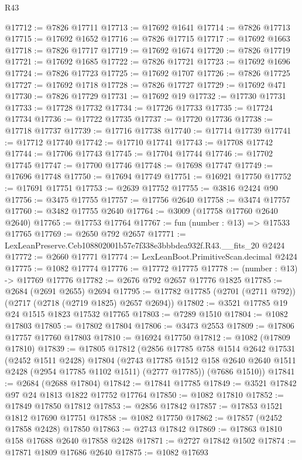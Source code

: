 \begin{lexlean}{R43}
\begin{coremodule}
@17712 := @7826 @17711
@17713 := @17692 @1641
@17714 := @7826 @17713
@17715 := @17692 @1652
@17716 := @7826 @17715
@17717 := @17692 @1663
@17718 := @7826 @17717
@17719 := @17692 @1674
@17720 := @7826 @17719
@17721 := @17692 @1685
@17722 := @7826 @17721
@17723 := @17692 @1696
@17724 := @7826 @17723
@17725 := @17692 @1707
@17726 := @7826 @17725
@17727 := @17692 @1718
@17728 := @7826 @17727
@17729 := @17692 @471
@17730 := @7826 @17729
@17731 := @17692 @19
@17732 := @17730 @17731
@17733 := @17728 @17732
@17734 := @17726 @17733
@17735 := @17724 @17734
@17736 := @17722 @17735
@17737 := @17720 @17736
@17738 := @17718 @17737
@17739 := @17716 @17738
@17740 := @17714 @17739
@17741 := @17712 @17740
@17742 := @17710 @17741
@17743 := @17708 @17742
@17744 := @17706 @17743
@17745 := @17704 @17744
@17746 := @17702 @17745
@17747 := @17700 @17746
@17748 := @17698 @17747
@17749 := @17696 @17748
@17750 := @17694 @17749
@17751 := @16921 @17750
@17752 := @17691 @17751
@17753 := @2639 @17752
@17755 := @3816 @2424 @90
@17756 := @3475 @17755
@17757 := @17756 @2640
@17758 := @3474 @17757
@17760 := @3482 @17755 @2640
@17764 := @3009 (@17758 @17760 @2640 @2640)
@17765 := @17753 @17764
@17767 := fun (number : @13) => @17533 @17765
@17769 := @2650 @792 @2657
@17771 := LexLeanPreserve.Ceb108802001b57e7f338e3bbbdea932f.R43.__fits_20 @2424
@17772 := @2660 @17771
@17774 := LexLeanBoot.PrimitiveScan.decimal @2424
@17775 := @1082 @17774
@17776 := @17772 @17775
@17778 := (number : @13) -> @17769 @17776
@17782 := @2676 @792 @2657 @17776 @1825
@17785 := @2684 (@2691 @2655) @2694
@17795 := @17782 @17785 (@2701 (@2711 @792)) (@2717 (@2718 (@2719 @1825) @2657 @2694))
@17802 := @3521 @17785 @19 @24 @1515 @1823 @17532 @17765
@17803 := @7289 @1510
@17804 := @1082 @17803
@17805 := @17802 @17804
@17806 := @3473 @2553
@17809 := @17806 @17757 @17760 @17803
@17810 := @16924 @17750
@17812 := @1082 (@17809 @17810)
@17839 := @17805
    @17812
    (@2856
      @17785
      @758
      @1514
      @2642
      @17531
      (@2452 @1511 @2428)
      @17804
      (@2743 @17785 @1512 @158 @2640 @2640 @1511 @2428 (@2954 @17785 @1102 @1511) (@2777 @17785))
      (@7686 @1510))
@17841 := @2684 (@2688 @17804)
@17842 := @17841 @17785
@17849 := @3521 @17842 @97 @24 @1813 @1822 @17752 @17764
@17850 := @1082 @17810
@17852 := @17849 @17850 @17812
@17853 := @2856 @17842
@17857 := @17853 @1521 @1812 @17690 @17751
@17858 := @1082 @17750
@17862 := @17857 (@2452 @17858 @2428) @17850
@17863 := @2743 @17842
@17869 := @17863 @1810 @158 @17688 @2640 @17858 @2428
@17871 := @2727 @17842 @1502
@17874 := @17871 @1809 @17686 @2640
@17875 := @1082 @17693

\end{coremodule}
\end{lexlean}

